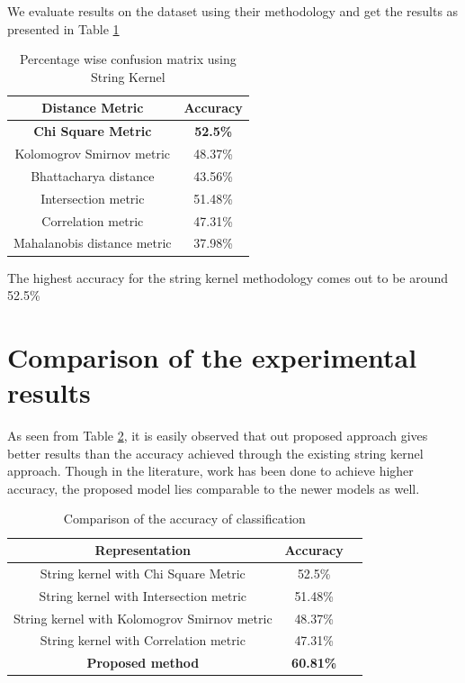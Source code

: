 We evaluate results on the dataset using their methodology and get the results as presented in Table \ref{string_CM}

\begin{table}[!htbp]
\centering
\begin{tabular}{|c|c|}
\hline
Distance Metric & Accuracy\\
\hline
\textbf{Chi Square Metric} & \textbf{52.5\%}\\
Kolomogrov Smirnov metric & 48.37\%\\
Bhattacharya distance & 43.56\%\\
Intersection metric & 51.48\%\\
Correlation metric & 47.31\%\\
Mahalanobis distance metric & 37.98\%\\
\hline
\end{tabular}
\caption{Percentage wise confusion matrix using String Kernel}
\label{string_CM}
\end{table}

The highest accuracy for the string kernel methodology comes out to be around 52.5\%

\section{Comparison of the experimental results}
As seen from Table \ref{comparison}, it is easily observed that out proposed approach gives better results than the accuracy achieved through the existing string kernel approach. Though in the literature, work has been done to achieve higher accuracy, the proposed model lies comparable to the newer models as well.
\begin{table}[!htbp]
\centering
\begin{tabular}{|c|c|c|}
\hline
Representation & Accuracy\\
\hline
String kernel with Chi Square Metric & 52.5\%\\
String kernel with Intersection metric & 51.48\%\\
String kernel with Kolomogrov Smirnov metric & 48.37\%\\
String kernel with Correlation metric & 47.31\%\\
\hline
\textbf{Proposed method} &\textbf{ 60.81\%}\\
\hline
\end{tabular}
\caption{Comparison of the accuracy of classification}
\label{comparison}
\end{table}

%